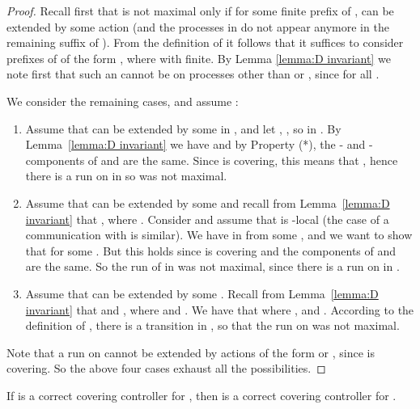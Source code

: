\documentclass[10pt,a4paper]{article}
\begin{document}
\begin{proof}
  Recall first that  is not maximal only if for some
  finite prefix  of ,  can be extended by some
  action  (and the processes in  do not appear anymore in
  the remaining suffix of ). From the definition of 
  it follows that it suffices to consider prefixes of 
  of the form , where  with  finite. By
  Lemma \ref{lemma:D invariant} we note first that such an  cannot be on
  processes other than  or , since
   for all .

We consider the remaining cases, and assume :

\begin{enumerate}
\item Assume that  can be extended by some  in
  , and let ,
  , so  in .  By
  Lemma~\ref{lemma:D invariant} we have  and by
  Property (*), the - and -components of  and
   are the same. Since  is covering, this
  means that , hence there is a run on  in 
  so  was not maximal.
\item Assume that  can be extended by some  and recall from Lemma~\ref{lemma:D invariant} that
  , where . Consider 
   and assume that  is -local (the
  case of a communication with  is similar). We have  in  from some , and we want
  to show that  for some . But this holds since  is
  covering and the  components of  and
   are the same. So the run of  in  was not
  maximal, since there is a run on  in . 
\item Assume that  can be extended by some . Recall from Lemma~\ref{lemma:D invariant} that
   and , where
   and
  . We have that
   where , and
  . According to the definition of , there is a
  transition 
  in , so that the run on  was not maximal.
\end{enumerate}
Note that a run on 
cannot be extended by actions of the form  or , since
 is covering. So the above four cases exhaust all the possibilities.
\end{proof}


\begin{lemma}\label{lemma:D correct}
 If  is a correct covering controller for , then 
  is a correct covering controller for .
\end{lemma}
\end{document}
